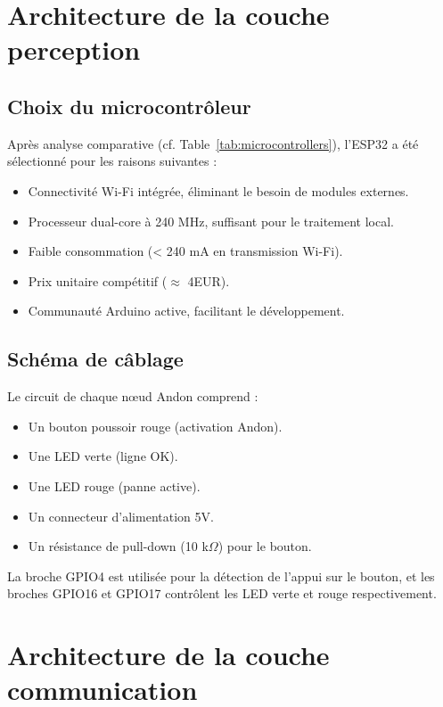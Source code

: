 \section{Architecture de la couche perception}

\subsection{Choix du microcontr\^oleur}

Apr\`es analyse comparative (cf. Table~\ref{tab:microcontrollers}), l'ESP32 a \'et\'e s\'electionn\'e pour les raisons suivantes :

\begin{itemize}
    \item Connectivit\'e Wi-Fi int\'egr\'ee, \'eliminant le besoin de modules externes.
    \item Processeur dual-core \`a 240 MHz, suffisant pour le traitement local.
    \item Faible consommation (< 240 mA en transmission Wi-Fi).
    \item Prix unitaire comp\'etitif ($\approx$ 4EUR).
    \item Communaut\'e Arduino active, facilitant le d\'eveloppement.
\end{itemize}

\subsection{Sch\'ema de câblage}

Le circuit de chaque n\oe{}ud Andon comprend :

\begin{itemize}
    \item Un bouton poussoir rouge (activation Andon).
    \item Une LED verte (ligne OK).
    \item Une LED rouge (panne active).
    \item Un connecteur d'alimentation 5V.
    \item Un r\'esistance de pull-down (10 k$\Omega$) pour le bouton.
\end{itemize}

La broche GPIO4 est utilis\'ee pour la d\'etection de l'appui sur le bouton, et les broches GPIO16 et GPIO17 contr\^olent les LED verte et rouge respectivement.

\section{Architecture de la couche communication}

